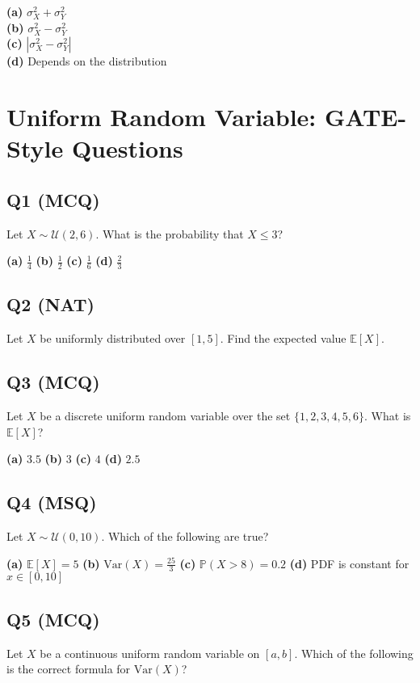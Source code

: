 \textbf{(a)} $\sigma_X^2 + \sigma_Y^2$ \\
\textbf{(b)} $\sigma_X^2 - \sigma_Y^2$ \\
\textbf{(c)} $|\sigma_X^2 - \sigma_Y^2|$ \\
\textbf{(d)} Depends on the distribution

\section{Uniform Random Variable: GATE-Style Questions}

\subsection*{Q1 (MCQ)}
Let $X \sim \mathcal{U}(2, 6)$. What is the probability that $X \leq 3$?

\textbf{(a)} $\frac{1}{4}$  
\textbf{(b)} $\frac{1}{2}$  
\textbf{(c)} $\frac{1}{6}$  
\textbf{(d)} $\frac{2}{3}$

\subsection*{Q2 (NAT)}
Let $X$ be uniformly distributed over $[1, 5]$. Find the expected value $\mathbb{E}[X]$.

\subsection*{Q3 (MCQ)}
Let $X$ be a discrete uniform random variable over the set $\{1,2,3,4,5,6\}$. What is $\mathbb{E}[X]$?

\textbf{(a)} $3.5$  
\textbf{(b)} $3$  
\textbf{(c)} $4$  
\textbf{(d)} $2.5$

\subsection*{Q4 (MSQ)}
Let $X \sim \mathcal{U}(0, 10)$. Which of the following are true?

\textbf{(a)} $\mathbb{E}[X] = 5$  
\textbf{(b)} $\text{Var}(X) = \frac{25}{3}$  
\textbf{(c)} $\mathbb{P}(X > 8) = 0.2$  
\textbf{(d)} PDF is constant for $x \in [0, 10]$

\subsection*{Q5 (MCQ)}
Let $X$ be a continuous uniform random variable on $[a,b]$. Which of the following is the correct formula for $\text{Var}(X)$?

